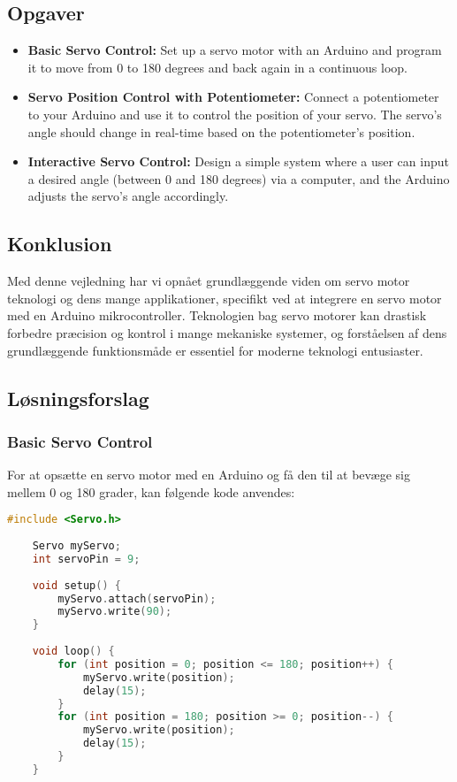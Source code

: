 \subsection*{Opgaver}
\begin{itemize}
	\item \textbf{Basic Servo Control:} Set up a servo motor with an Arduino and program it to move from 0 to 180 degrees and back again in a continuous loop.
	\item \textbf{Servo Position Control with Potentiometer:} Connect a potentiometer to your Arduino and use it to control the position of your servo. The servo's angle should change in real-time based on the potentiometer's position.
	\item \textbf{Interactive Servo Control:} Design a simple system where a user can input a desired angle (between 0 and 180 degrees) via a computer, and the Arduino adjusts the servo's angle accordingly.
\end{itemize}

\subsection*{Konklusion}
Med denne vejledning har vi opnået grundlæggende viden om servo motor teknologi og dens mange applikationer, specifikt ved at integrere en servo motor med en Arduino mikrocontroller. Teknologien bag servo motorer kan drastisk forbedre præcision og kontrol i mange mekaniske systemer, og forståelsen af dens grundlæggende funktionsmåde er essentiel for moderne teknologi entusiaster.

\subsection*{Løsningsforslag}
\subsubsection*{Basic Servo Control}
For at opsætte en servo motor med en Arduino og få den til at bevæge sig mellem 0 og 180 grader, kan følgende kode anvendes:

\begin{lstlisting}[language=C++, caption=Basic Servo Motor Control]
	#include <Servo.h>
	
	Servo myServo;  
	int servoPin = 9;
	
	void setup() {
		myServo.attach(servoPin);
		myServo.write(90);  
	}
	
	void loop() {
		for (int position = 0; position <= 180; position++) {
			myServo.write(position);
			delay(15);
		}
		for (int position = 180; position >= 0; position--) {
			myServo.write(position);
			delay(15);
		}
	}
\end{lstlisting}
\clearpage
